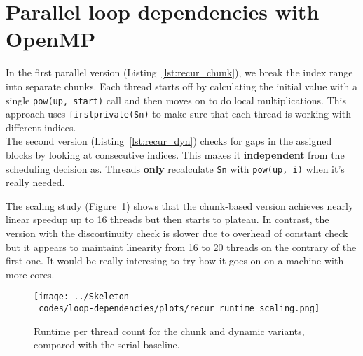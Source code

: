 \section{Parallel loop dependencies with OpenMP }

In the first parallel version (Listing~\ref{lst:recur_chunk}), we break the index range into separate chunks. Each thread starts off by calculating the initial value with a single \texttt{pow(up, start)} call and then moves on to do local multiplications. This approach uses \texttt{firstprivate(Sn)} to make sure that each thread is working with different indices. \\

The second version (Listing~\ref{lst:recur_dyn}) checks for gaps in the assigned blocks by looking at consecutive indices. This makes it \textbf{independent} from the scheduling decision as. Threads \textbf{only} recalculate \texttt{Sn} with \texttt{pow(up, i)} when it's really needed.





The scaling study (Figure~\ref{fig:recur_scaling}) shows that the chunk-based version achieves nearly linear speedup up to 16 threads but then starts to plateau. In contrast, the version with the discontinuity check is slower due to overhead of constant check but it appears to maintaint linearity from 16 to 20 threads on the contrary of the first one. It would be really interesing to try how it goes on on  a machine with more cores.

\begin{figure}[H]
    \centering
    \texttt{[image: ../Skeleton\\\_codes/loop-dependencies/plots/recur\_runtime\_scaling.png]}
    \caption{Runtime per thread count for the chunk and dynamic variants, compared with the serial baseline.}
    \label{fig:recur_scaling}
\end{figure}
